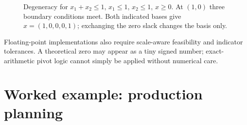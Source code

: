 \documentclass[11pt,a4paper]{article}
\begin{document}
\begin{figure}[H]
  \centering
  \caption{Degeneracy for $x_1+x_2\leq1$, $x_1\leq1$, $x_2\leq1$, $x\geq0$.
    At $(1,0)$ three boundary conditions meet. Both indicated bases give
    $x=(1,0,0,0,1)$; exchanging the zero slack changes the basis only.}
  \label{fig:degeneracy}
\end{figure}
Floating-point implementations also require scale-aware feasibility and
indicator tolerances. A theoretical zero may appear as a tiny signed number;
exact-arithmetic pivot logic cannot simply be applied without numerical care.

\clearpage
\section{Worked example: production planning}\label{sec:production}
\end{document}
